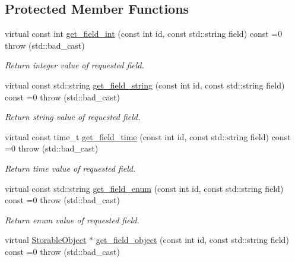 \subsection*{Protected Member Functions}
\begin{DoxyCompactItemize}
\item 
virtual const int \hyperlink{classStorage_1_1AbstractStorage_a80a7e4ab87a0326aa8b5571b09d55eaa}{get\_\-field\_\-int} (const int id, const std::string field) const =0  throw (std::bad\_\-cast)
\begin{DoxyCompactList}\small\item\em Return integer value of requested field. \item\end{DoxyCompactList}\item 
virtual const std::string \hyperlink{classStorage_1_1AbstractStorage_ad12a3abb791ef5a696196c28e643ec22}{get\_\-field\_\-string} (const int id, const std::string field) const =0  throw (std::bad\_\-cast)
\begin{DoxyCompactList}\small\item\em Return string value of requested field. \item\end{DoxyCompactList}\item 
virtual const time\_\-t \hyperlink{classStorage_1_1AbstractStorage_a87fe8d51934ab2403758d905ef313272}{get\_\-field\_\-time} (const int id, const std::string field) const =0  throw (std::bad\_\-cast)
\begin{DoxyCompactList}\small\item\em Return time value of requested field. \item\end{DoxyCompactList}\item 
virtual const std::string \hyperlink{classStorage_1_1AbstractStorage_acd7e88a005b6873632c7f20245e5f3f7}{get\_\-field\_\-enum} (const int id, const std::string field) const =0  throw (std::bad\_\-cast)
\begin{DoxyCompactList}\small\item\em Return enum value of requested field. \item\end{DoxyCompactList}\item 
virtual \hyperlink{classStorage_1_1StorableObject}{StorableObject} $\ast$ \hyperlink{classStorage_1_1AbstractStorage_aaff107d1f51e456f26c03861beb0fff7}{get\_\-field\_\-object} (const int id, const std::string field) const =0  throw (std::bad\_\-cast)

\end{DoxyCompactItemize}

